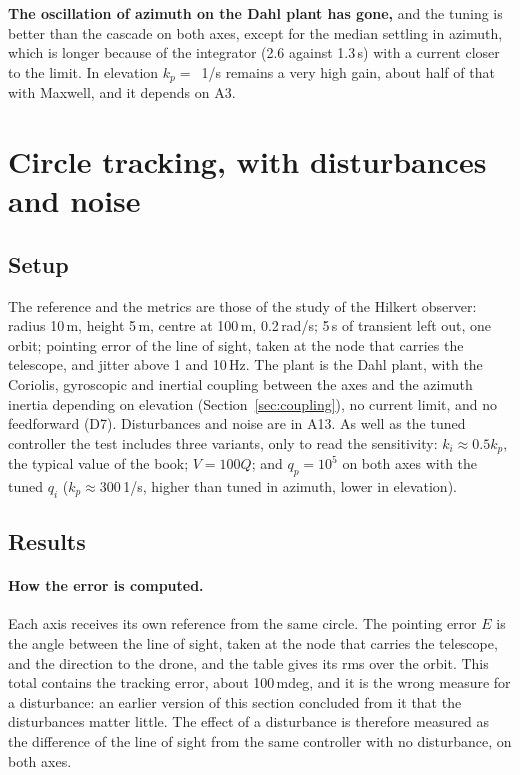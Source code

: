 \documentclass[10pt,a4paper]{article}
\numberwithin{equation}{section}
\begin{document}
\textbf{The oscillation of azimuth on the Dahl plant has gone,} and the tuning is better than the cascade on both axes, except for the median settling in azimuth, which is longer because of the integrator (2.6 against 1.3\,s) with a current closer to the limit. In elevation $k_p=$ \nbKpP\,1/s remains a very high gain, about half of that with Maxwell, and it depends on A3.

\section{Circle tracking, with disturbances and noise}\label{sec:circle}
\subsection{Setup}
The reference and the metrics are those of the study of the Hilkert observer: radius 10\,m, height 5\,m, centre at 100\,m, 0.2\,rad/s; 5\,s of transient left out, one orbit; pointing error of the line of sight, taken at the node that carries the telescope, and jitter above 1 and 10\,Hz. The plant is the Dahl plant, with the Coriolis, gyroscopic and inertial coupling between the axes and the azimuth inertia depending on elevation (Section~\ref{sec:coupling}), no current limit, and no feedforward (D7). Disturbances and noise are in A13. As well as the tuned controller the test includes three variants, only to read the sensitivity: $k_i\approx0.5k_p$, the typical value of the book; $V=100Q$; and $q_p=10^5$ on both axes with the tuned $q_i$ ($k_p\approx300$\,1/s, higher than tuned in azimuth, lower in elevation).

\subsection{Results}
\paragraph{How the error is computed.} Each axis receives its own reference from the same circle. The pointing error $E$ is the angle between the line of sight, taken at the node that carries the telescope, and the direction to the drone, and the table gives its rms over the orbit. This total contains the tracking error, about 100\,mdeg, and it is the wrong measure for a disturbance: an earlier version of this section concluded from it that the disturbances matter little. The effect of a disturbance is therefore measured as the difference of the line of sight from the same controller with no disturbance, on both axes.
\end{document}
